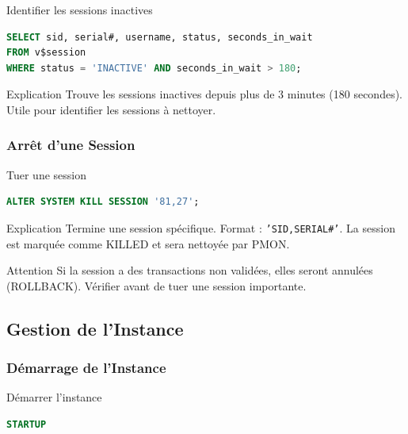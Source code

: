 \documentclass[12pt,a4paper]{article}
\begin{document}
\begin{commande}{Identifier les sessions inactives}
\begin{lstlisting}[language=SQL]
SELECT sid, serial#, username, status, seconds_in_wait
FROM v$session
WHERE status = 'INACTIVE' AND seconds_in_wait > 180;
\end{lstlisting}
\end{commande}

\begin{explication}{Explication}
Trouve les sessions inactives depuis plus de 3 minutes (180 secondes). Utile pour identifier les sessions à nettoyer.
\end{explication}

\subsubsection{Arrêt d'une Session}

\begin{commande}{Tuer une session}
\begin{lstlisting}[language=SQL]
ALTER SYSTEM KILL SESSION '81,27';
\end{lstlisting}
\end{commande}

\begin{explication}{Explication}
Termine une session spécifique. Format : \texttt{'SID,SERIAL\#'}. La session est marquée comme KILLED et sera nettoyée par PMON.
\end{explication}

\begin{attention}{Attention}
Si la session a des transactions non validées, elles seront annulées (ROLLBACK). Vérifier avant de tuer une session importante.
\end{attention}

\subsection{Gestion de l'Instance}

\subsubsection{Démarrage de l'Instance}

\begin{commande}{Démarrer l'instance}
\begin{lstlisting}[language=SQL]
STARTUP
\end{lstlisting}
\end{commande}
\end{document}
